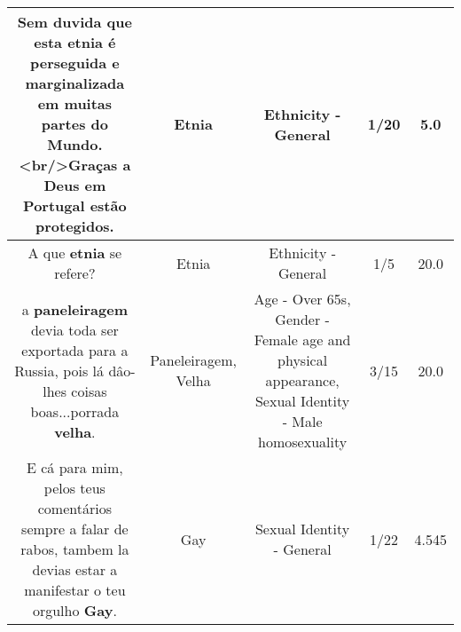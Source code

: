 \documentclass[11pt]{article}
\newlength\mylength
\begin{document}
\begin{center}
\begin{longtable}{|C{.65\mylength}|C{.30\mylength}|C{.12\mylength}|C{.12\mylength}|C{.12\mylength}|}
  \small Sem duvida que esta \textbf{etnia} é perseguida e marginalizada em muitas partes do Mundo.<br/>Graças a Deus em Portugal estão protegidos.\normalsize   & Etnia & Ethnicity - General & 1/20 & 5.0 \\  \hline
  \small A que \textbf{etnia} se refere?\normalsize   & Etnia & Ethnicity - General & 1/5 & 20.0 \\  \hline
  \small a \textbf{paneleiragem} devia toda ser exportada para a Russia, pois lá dâo-lhes  coisas boas...porrada \textbf{v\textbf{elha}}.\normalsize   & Paneleiragem, Velha & Age - Over 65s, Gender - Female age and physical appearance, Sexual Identity - Male homosexuality & 3/15 & 20.0 \\  \hline
  \small E cá para mim, pelos teus comentários sempre a falar de rabos, tambem la devias estar a manifestar o teu orgulho \textbf{Gay}.\normalsize   & Gay & Sexual Identity - General & 1/22 & 4.545 \\  \hline
  
\end{longtable}
\end{center}
\end{document}
